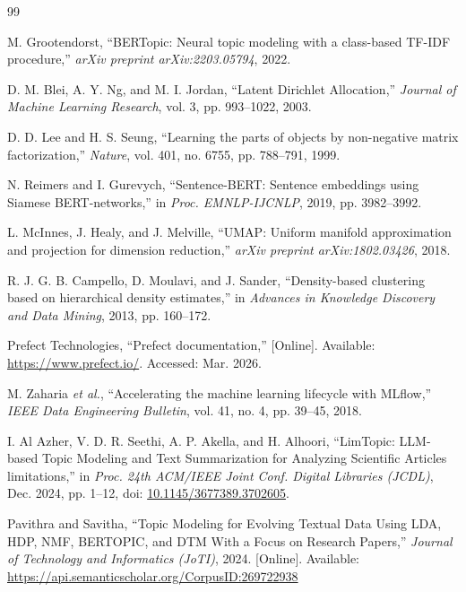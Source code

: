 \documentclass[conference]{IEEEtran}
\begin{document}
\begin{thebibliography}{99}

M. Grootendorst, ``BERTopic: Neural topic modeling with a class-based TF-IDF procedure,'' \emph{arXiv preprint arXiv:2203.05794}, 2022.

D. M. Blei, A. Y. Ng, and M. I. Jordan, ``Latent Dirichlet Allocation,'' \emph{Journal of Machine Learning Research}, vol. 3, pp. 993--1022, 2003.

D. D. Lee and H. S. Seung, ``Learning the parts of objects by non-negative matrix factorization,'' \emph{Nature}, vol. 401, no. 6755, pp. 788--791, 1999.

N. Reimers and I. Gurevych, ``Sentence-BERT: Sentence embeddings using Siamese BERT-networks,'' in \emph{Proc. EMNLP-IJCNLP}, 2019, pp. 3982--3992.

L. McInnes, J. Healy, and J. Melville, ``UMAP: Uniform manifold approximation and projection for dimension reduction,'' \emph{arXiv preprint arXiv:1802.03426}, 2018.

R. J. G. B. Campello, D. Moulavi, and J. Sander, ``Density-based clustering based on hierarchical density estimates,'' in \emph{Advances in Knowledge Discovery and Data Mining}, 2013, pp. 160--172.

Prefect Technologies, ``Prefect documentation,'' [Online]. Available: \url{https://www.prefect.io/}. Accessed: Mar. 2026.

M. Zaharia \emph{et al.}, ``Accelerating the machine learning lifecycle with MLflow,'' \emph{IEEE Data Engineering Bulletin}, vol. 41, no. 4, pp. 39--45, 2018.

I. Al Azher, V. D. R. Seethi, A. P. Akella, and H. Alhoori, ``LimTopic: LLM-based Topic Modeling and Text Summarization for Analyzing Scientific Articles limitations,'' in \emph{Proc. 24th ACM/IEEE Joint Conf. Digital Libraries (JCDL)}, Dec. 2024, pp. 1--12, doi: \url{10.1145/3677389.3702605}.

Pavithra and Savitha, ``Topic Modeling for Evolving Textual Data Using LDA, HDP, NMF, BERTOPIC, and DTM With a Focus on Research Papers,'' \emph{Journal of Technology and Informatics (JoTI)}, 2024. [Online]. Available: \url{https://api.semanticscholar.org/CorpusID:269722938}

\end{thebibliography}

\balance
\end{document}
